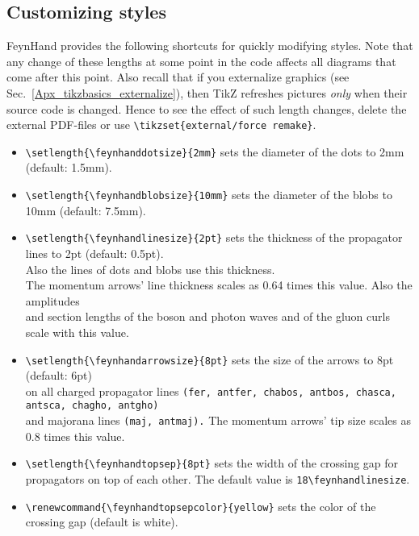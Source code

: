 \documentclass[10pt,letterpaper,twoside,notitlepage]{article}
\numberwithin{figure}{section}
\begin{document}
%
\begin{minipage}{0.15\linewidth}
\end{minipage}
%
%
%
\subsection{Customizing styles}
\label{sec:_feynmandiagrams_customizing}
%
FeynHand provides the following shortcuts for quickly modifying styles.
Note that any change of these lengths at some point in the code
affects all diagrams that come after this point.
Also recall that if you externalize graphics (see Sec.~\ref{Apx_tikzbasics_externalize}),
then TikZ refreshes pictures \emph{only} when their source code is changed.
Hence to see the effect of such length changes, 
delete the external PDF-files or use \vercol\verb$\tikzset{external/force remake}$\txcol.
%
\begin{itemize}
	\item
	\vercol\verb$\setlength{\feynhanddotsize}{2mm}$\txcol
	sets the diameter of the dots to 2mm (default: 1.5mm).
	\item
	\vercol\verb$\setlength{\feynhandblobsize}{10mm}$\txcol
	sets the diameter of the blobs to 10mm (default: 7.5mm).
	\item
	\vercol\verb$\setlength{\feynhandlinesize}{2pt}$\txcol
	sets the thickness of the propagator lines to 2pt (default: 0.5pt).\\
	Also the lines of dots and blobs use this thickness.\\
	The momentum arrows' line thickness scales as 0.64 times this value.
	Also the amplitudes\\
	and section lengths of the boson and photon waves
	and of the gluon curls scale with this value.
	\item
	\vercol\verb$\setlength{\feynhandarrowsize}{8pt}$\txcol
	sets the size of the arrows to 8pt (default: 6pt)\\
	on all charged propagator lines
	\vercol\verb$(fer, antfer, chabos, antbos, chasca, antsca, chagho, antgho)$\txcol\\
	and majorana lines \vercol\verb$(maj, antmaj).$\txcol
	The momentum arrows' tip size scales as 0.8 times this value.
	\item
	\vercol\verb$\setlength{\feynhandtopsep}{8pt}$\txcol
	sets the width of the crossing gap for propagators on top of each other.
	The default value is \vercol\verb$18\feynhandlinesize$\txcol.
	\item
	\vercol\verb$\renewcommand{\feynhandtopsepcolor}{yellow}$\txcol
	sets the color of the crossing gap (default is white).	
\end{itemize}
\end{document}
